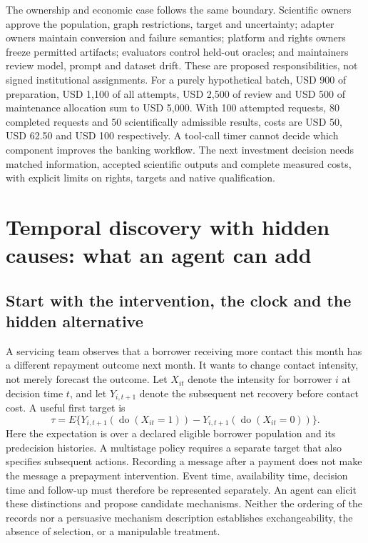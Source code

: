The ownership and economic case follows the same boundary. Scientific owners
approve the population, graph restrictions, target and uncertainty; adapter
owners maintain conversion and failure semantics; platform and rights owners
freeze permitted artifacts; evaluators control held-out oracles; and maintainers
review model, prompt and dataset drift. These are proposed responsibilities,
not signed institutional assignments. For a purely hypothetical batch, USD 900
of preparation, USD 1,100 of all attempts, USD 2,500 of review and USD 500 of
maintenance allocation sum to USD 5,000. With 100 attempted requests, 80
completed requests and 50 scientifically admissible results, costs are USD 50,
USD 62.50 and USD 100 respectively. A tool-call timer cannot decide which
component improves the banking workflow. The next investment decision needs
matched information, accepted scientific outputs and complete measured costs,
with explicit limits on rights, targets and native qualification.~\citep{exec25_agents_choice}


\section{Temporal discovery with hidden causes: what an agent can add}
\label{exec15:latent-temporal}

\subsection{Start with the intervention, the clock and the hidden alternative}

A servicing team observes that a borrower receiving more contact this month
has a different repayment outcome next month. It wants to change contact
intensity, not merely forecast the outcome. Let $X_{it}$ denote the intensity
for borrower $i$ at decision time $t$, and let $Y_{i,t+1}$ denote the subsequent
net recovery before contact cost. A useful first target is
\[
 \tau=E\{Y_{i,t+1}(\operatorname{do}(X_{it}=1))
             -Y_{i,t+1}(\operatorname{do}(X_{it}=0))\}.
\]
Here the expectation is over a declared eligible borrower population and its
predecision histories. A multistage policy requires a separate target that
also specifies subsequent actions. Recording a message after a payment does
not make the message a prepayment intervention. Event time, availability time,
decision time and follow-up must therefore be represented separately. An agent
can elicit these distinctions and propose candidate mechanisms. Neither the
ordering of the records nor a persuasive mechanism description establishes
exchangeability, the absence of selection, or a manipulable treatment.
\citep{v12_la_2606_23608,exec15_latent_design}

